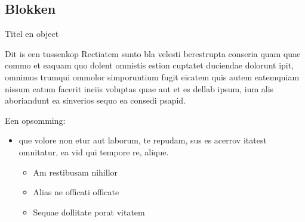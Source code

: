 \documentclass[department=none, notes={show notes}, slidesperpage=4, official=true, handout]{beamerruhuisstijl}
\begin{document}
\subsection{Blokken}
\begin{frame}{Titel en object}
    \begin{block}{Dit is een tussenkop}
    Rectiatem sunto bla velesti berestrupta conseria quam quae commo et eaquam quo dolent omnistis estion cuptatet duciendae dolorunt ipit, omnimus trumqui ommolor simporuntium fugit eicatem quis autem eatemquiam nissum eatum facerit inciis voluptas quae aut et es dellab ipsum, ium alis aboriandunt ea sinverios sequo ea consedi psapid.
    \end{block}

    \begin{block}{}
    Een opsomming:
    \begin{itemize}
        \item que volore non etur aut laborum, te repudam, sus es acerrov itatest omnitatur, ea vid qui tempore re, alique.
        \begin{itemize}
            \item Am restibusam nihillor 
            \item Alias ne officati officate
            \item Sequae dollitate porat vitatem
        \end{itemize}
    \end{itemize}
    \end{block}
\end{frame}
\note{
}
\end{document}
